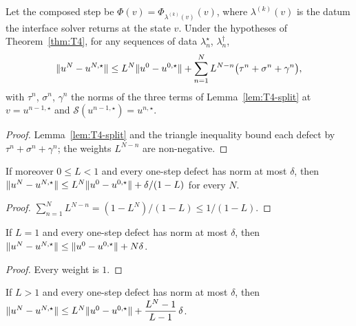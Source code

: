 \begin{corollary}\label{cor:T4-three}
  \leanok
  Let the composed step be $\Phi(v)=\Phi_{\lambda^{(k)}(v)}(v)$, where
  $\lambda^{(k)}(v)$ is the datum the interface solver returns at the state $v$.
  Under the hypotheses of Theorem~\ref{thm:T4}, for any sequences of data
  $\lambda^{\star}_n$, $\lambda^{\dagger}_n$,
  \[
    \lVert u^N-u^{N,\star}\rVert\le L^N\lVert u^0-u^{0,\star}\rVert
      +\sum_{n=1}^{N}L^{N-n}\bigl(\tau^n+\sigma^n+\gamma^n\bigr),
  \]
  with $\tau^n$, $\sigma^n$, $\gamma^n$ the norms of the three terms of
  Lemma~\ref{lem:T4-split} at $v=u^{n-1,\star}$ and
  $\mathcal S(u^{n-1,\star})=u^{n,\star}$.
\end{corollary}

\begin{proof}
  \leanok
  Lemma~\ref{lem:T4-split} and the triangle inequality bound each defect by
  $\tau^n+\sigma^n+\gamma^n$; the weights $L^{N-n}$ are non-negative.
\end{proof}

\begin{corollary}\label{cor:T4-contractive}
  \leanok
  If moreover $0\le L<1$ and every one-step defect has norm at most $\delta$,
  then $\lVert u^N-u^{N,\star}\rVert\le L^N\lVert u^0-u^{0,\star}\rVert+\delta/(1-L)$ for
  every $N$.
\end{corollary}

\begin{proof}
  \leanok
  $\sum_{n=1}^{N}L^{N-n}=(1-L^N)/(1-L)\le1/(1-L)$.
\end{proof}

\begin{corollary}\label{cor:T4-nonexpansive}
  \leanok
  If $L=1$ and every one-step defect has norm at most $\delta$, then
  $\lVert u^N-u^{N,\star}\rVert\le\lVert u^0-u^{0,\star}\rVert+N\delta$.
\end{corollary}

\begin{proof}
  \leanok
  Every weight is $1$.
\end{proof}

\begin{corollary}\label{cor:T4-expansive}
  \leanok
  If $L>1$ and every one-step defect has norm at most $\delta$, then
  $\lVert u^N-u^{N,\star}\rVert\le L^N\lVert u^0-u^{0,\star}\rVert
  +\dfrac{L^N-1}{L-1}\,\delta$.
\end{corollary}

